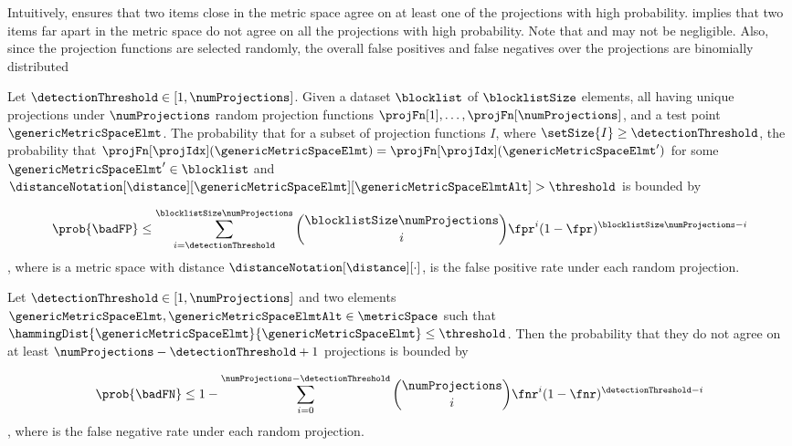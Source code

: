 \begin{definition}
		

\end{definition}

Intuitively,  ensures that two items close in the metric space agree on at least one of the projections 
with high probability.  implies that two items far apart in the metric space do not agree on all the projections 
with high probability. Note that \fpr and \fnr may not be negligible. Also, since the projection functions are selected randomly, the overall false positives and false negatives over the projections are binomially distributed 


\begin{corollary}
 \label{eq:false_pos_bound} 
Let $\detectionThreshold \in [1, \numProjections]$. Given a dataset $\blocklist$ of $\blocklistSize$ elements, all having unique projections under $\numProjections$ random projection functions $\projFn[1], \dots, \projFn[\numProjections]$, and a  test point $\genericMetricSpaceElmt$. The probability that for a subset of projection functions $I$, where $\setSize{I} \ge \detectionThreshold$, the probability that $\projFn[\projIdx](\genericMetricSpaceElmt) = \projFn[\projIdx](\genericMetricSpaceElmt')$ for some $\genericMetricSpaceElmt' \in \blocklist$ and $\distanceNotation[\distance][\genericMetricSpaceElmt][\genericMetricSpaceElmtAlt] > 
			\threshold$ is bounded by 


\[			 \prob{\badFP}
 \le \sum\limits_{i = \detectionThreshold}^{\blocklistSize \numProjections} \binom{\blocklistSize\numProjections}{i} \fpr^{i} (1 - \fpr)^{\blocklistSize \numProjections - i}
\]
, where  \metricSpace is a metric space with distance $\distanceNotation[\distance][\cdot]$, \fpr is the false positive rate under each random projection.
\end{corollary}


\begin{corollary}
 \label{eq:false_neg_bound}
Let $\detectionThreshold \in [1, \numProjections]$ and two elements $\genericMetricSpaceElmt, \genericMetricSpaceElmtAlt \in \metricSpace$ such that $\hammingDist{\genericMetricSpaceElmt}{\genericMetricSpaceElmt} \le \threshold$. Then the probability that they do not agree on at least $\numProjections - \detectionThreshold + 1$ projections is bounded by 

\[	
\prob{\badFN} \le 1 - \sum\limits_{i = 0}^{\numProjections - \detectionThreshold} \binom{\numProjections}{i} \fnr^{i} (1 - \fnr)^{\detectionThreshold - i}
\]
, where \fnr is the false negative rate under each random projection.

\end{corollary}


